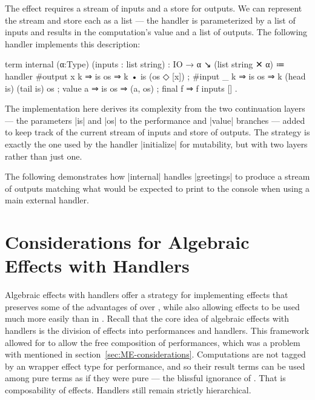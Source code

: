 The \IO effect requires a stream of inputs and a store for outputs.
We can represent the stream and store each as a list --- the \IO handler is parameterized by a list of inputs and results in the computation's value and a list of outputs.
The following handler implements this description:
%
\begin{program}[caption={Handler for pure \IO}]
term internal (α:Type) (inputs : list string) : IO → α ↘ (list string ✕ α)
  ≔ handler
      { #output x k ⇒ is os ⇒ k • is (os ◇ [x])
      ; #input  _ k ⇒ is os ⇒ k (head is) (tail is) os
      ; value     a ⇒ is os ⇒ (a, os)
      ; final     f ⇒ f inputs [] }.
\end{program}
%
The implementation here derives its complexity from the two continuation layers --- the parameters \code|is| and \code|os| to the performance and \code|value| branches --- added to keep track of the current stream of inputs and store of outputs.
The strategy is exactly the one used by the handler \code|initialize| for mutability, but with two layers rather than just one.

The following demonstrates how \code|internal| handles \code|greetings| to produce a stream of outputs matching what would be expected to print to the console when using a main external handler.

\newpage


\section{Considerations for Algebraic Effects with Handlers}
\label{sec:AEH-considerations}

Algebraic effects with handlers offer a strategy for implementing effects that preserves some of the advantages of \LangC over \LangB, while also allowing effects to be used much more easily than in \LangC.
Recall that the core idea of algebraic effects with handlers is the division of effects into performances and handlers.
This framework allowed for \LangD to allow the free composition of performances, which was a problem with \LangC mentioned in section~\ref{sec:ME-considerations}.
Computations are not tagged by an wrapper effect type for performance, and so their result terms can be used among pure terms as if they were pure --- the blissful ignorance of \LangB.
That is composability of effects.
Handlers still remain strictly hierarchical.

